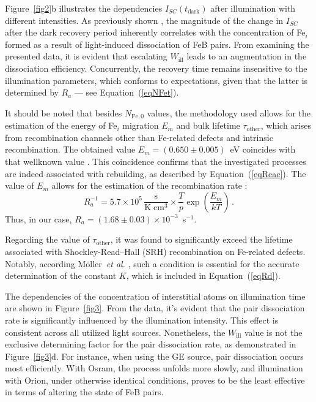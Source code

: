\documentclass{WileyMSP-template}
\begin{document}
Figure~\ref{fig2}b illustrates the dependencies $I_{SC}(t_\mathrm{dark})$ after illumination with different intensities.
As previously shown \cite{Olikh2021JAP}, the magnitude of the change in $I_{SC}$ after the dark recovery period
inherently correlates with the concentration of Fe$_i$ formed as a result of light-induced dissociation of FeB pairs.
From examining the presented data, it is evident that escalating $W_\mathrm{ill}$ leads to an augmentation in the dissociation efficiency.
Concurrently, the recovery time remains insensitive to the illumination parameters, which conforms to expectations,
given that the latter is determined by $R_a$ --- see Equation~(\ref{eqNFet}).

It should be noted that besides $N_\mathrm{Fe,0}$ values, 
the methodology used allows for the estimation of the energy of Fe$_i$ migration $E_m$ 
and bulk lifetime $\tau_\mathrm{other}$, which arises from recombination channels other than Fe-related defects and intrinsic recombination.
The obtained value $E_m=(0.650\pm0.005)$~eV coincides with that wellknown value \cite{FeBKin2019,FeBAssSST2011,FeBkinAPL2008}.
This coincidence confirms that the investigated processes are indeed associated with rebuilding, 
as described by Equation~(\ref{eqReac}).
The value of $E_m$ allows for the estimation of the recombination rate \cite{FeBAssJAP2014,FeBKin2019,FeBAssSST2011}:
\begin{equation}
\label{eqTass}
R_a^{-1}=5.7\times10^5\,\frac{\mathrm{s}}{\mathrm{K}\;\mathrm{cm}^3}\times\frac{T}{p}\exp\left(\frac{E_m}{kT}\right)\,.
\end{equation}
Thus, in our case, $R_a=(1.68\pm0.03)\times10^{-3}$~s$^{-1}$.

Regarding the value of $\tau_\mathrm{other}$, it was found to significantly exceed the 
lifetime associated with Shockley-Read–Hall (SRH) recombination on Fe-related defects. 
Notably, according M\"{o}ller~\emph{et al.} \cite{FeBAssJAP2014}, 
such a condition is essential for the accurate determination of the constant $K$, which is included in Equation~(\ref{eqRd}).


The dependencies of the concentration of interstitial atoms on illumination time are shown in Figure~\ref{fig3}. 
From the data, it's evident that the pair dissociation rate is significantly influenced by the illumination intensity.
This effect is consistent across all utilized light sources.
Nonetheless, the $W_\mathrm{ill}$ value is not the exclusive determining factor for the pair dissociation rate, 
as demonstrated in Figure~\ref{fig3}d.
For instance, when using the GE source, pair dissociation occurs most efficiently. 
With Osram, the process unfolds more slowly, 
and illumination with Orion, under otherwise identical conditions, proves to be the least effective in terms of altering the state of FeB pairs.
\end{document}

